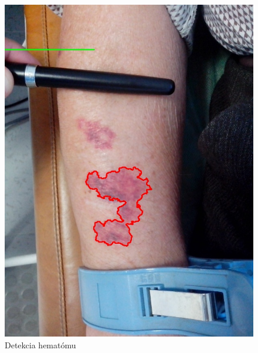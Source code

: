 \begin{figure}[h]
   \begin{minipage}{0.4\textwidth}
     \centering
     \includegraphics[scale=0.35]{fig/2o.jpeg}
      \caption{Detekcia hematómu}
      \label{fig:w2}
   \end{minipage}\hfill
   \begin{minipage}{0.4\textwidth}
     \centering

\end{minipage}
\end{figure}
